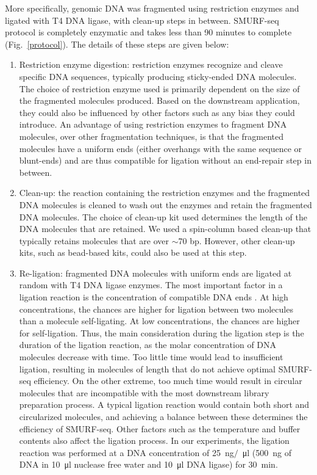 More specifically, genomic DNA was fragmented using restriction enzymes
and ligated with T4 DNA ligase, with clean-up steps in between.
SMURF-seq protocol is completely enzymatic and takes less than 90
minutes to complete (Fig.~\ref{protocol}).  The details of these steps
are given below:
\begin{enumerate}
\item Restriction enzyme digestion: restriction enzymes recognize
  and cleave specific DNA sequences, typically producing sticky-ended DNA
  molecules.
  The choice of restriction enzyme used is primarily dependent on the
  size of the fragmented molecules produced. Based on the downstream
  application, they could also be influenced by other factors such as any
  bias they could introduce.
  An advantage of using restriction enzymes to fragment DNA molecules,
  over other fragmentation techniques, is that the fragmented molecules
  have a uniform ends (either overhangs with the same sequence or
  blunt-ends) and are thus compatible for ligation without an end-repair
  step in between.

\item Clean-up: the reaction containing the restriction enzymes and the
  fragmented DNA molecules is cleaned to wash out the enzymes and retain
  the fragmented DNA molecules. The choice of clean-up kit used determines
  the length of the DNA molecules that are retained. We used a spin-column
  based clean-up that typically retains molecules that are over $\sim$70
  bp. However, other clean-up kits, such as bead-based kits, could also be
  used at this step.

\item Re-ligation: fragmented DNA molecules with uniform ends are
  ligated at random with T4 DNA ligase enzymes.
  The most important factor in a ligation reaction is the
  concentration of compatible DNA ends \citep{dugaiczyk1975ligation}. At
  high concentrations, the chances are higher for ligation between two
  molecules than a molecule self-ligating. At low concentrations, the
  chances are higher for self-ligation.
  Thus, the main consideration during the ligation step is the
  duration of the ligation reaction, as the molar concentration of DNA
  molecules decrease with time. Too little time would lead to insufficient
  ligation, resulting in molecules of length that do not achieve optimal
  SMURF-seq efficiency. On the other extreme, too much time would result
  in circular molecules that are incompatible with the most downstream
  library preparation process. A typical ligation reaction would contain
  both short and circularized molecules, and achieving a balance between
  these determines the efficiency of SMURF-seq.
  Other factors such as the temperature and buffer contents also affect
  the ligation process.
  In our experiments, the ligation reaction was performed at a DNA
  concentration of \SI{25}{\nano\gram}$/$\SI{}{\micro\litre}
  (\SI{500}{\nano\gram} of DNA in \SI{10}{\micro\litre} nuclease free
  water and \SI{10}{\micro\litre} DNA ligase) for \SI{30}{\minute}.


\end{enumerate}
